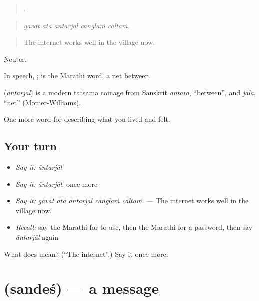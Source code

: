 \begin{quote}
    .
\end{quote}

\begin{quote}
\emph{gāvāt ātā āntarjāl cāṅglaṁ cāltaṁ.}
\end{quote}

\begin{quote}
The internet works well in the village now.
\end{quote}

Neuter.

In speech, ;  is the Marathi word, a net between.

\begin{cousinweb}
\textbf{} (\emph{āntarjāl}) is a modern tatsama coinage from Sanskrit \emph{antara}, \textquotedblleft{}between\textquotedblright{}, and \emph{jāla}, \textquotedblleft{}net\textquotedblright{} (Monier-Williams).
\end{cousinweb}

\begin{grammarlens}[title={What you've built}]
One more word for describing what you lived and felt.
\end{grammarlens}

\subsection*{Your turn}
\begin{itemize}
\raggedright
  \item \emph{Say it:} \emph{āntarjāl}
  \item \emph{Say it:} \emph{āntarjāl}, once more
  \item \emph{Say it:} \emph{gāvāt ātā āntarjāl cāṅglaṁ cāltaṁ.} — The internet works well in the village now.
  \item \emph{Recall:} say the Marathi for to use, then the Marathi for a password, then say \emph{āntarjāl} again
\end{itemize}

\begin{tcolorbox}[breakable,colback=teal!4,colframe=teal!35!black,title={Before you move on}]
What does  mean? (\textquotedblleft{}The internet\textquotedblright{}.) Say it once more.
\end{tcolorbox}
\section[\texorpdfstring{\mr{संदेश} (sandeś)}{संदेश (sandeś)}]{ (sandeś) — a message}

